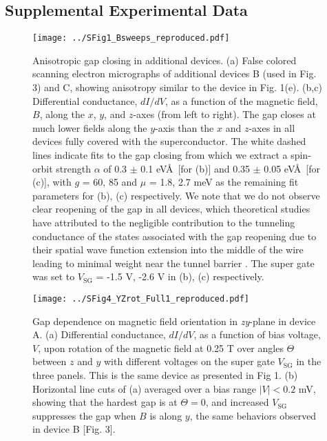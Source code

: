 \subsection{Supplemental Experimental Data}
\begin{figure}[h!]
\centering
\texttt{[image: ../SFig1\_Bsweeps\_reproduced.pdf]}
\caption{\label{fig:BsweepsReproduced}
    Anisotropic gap closing in additional devices. 
    (a) False colored scanning electron micrographs of additional devices B (used in Fig. 3) and C, showing anisotropy similar to the device in Fig. 1(e). (b,c) Differential conductance, $dI/dV$, as a function of the magnetic field, $B$, along the $x$, $y$, and $z$-axes (from left to right). The gap closes at much lower fields along the $y$-axis than the $x$ and $z$-axes in all devices fully covered with the superconductor. The white dashed lines indicate fits to the gap closing from which we extract a spin-orbit strength $\alpha$ of 0.3 $\pm$ 0.1 eV\AA\ [for (b)] and 0.35 $\pm$ 0.05 eV\AA\ [for (c)], with $g$ = 60, 85 and $\mu$ = 1.8, 2.7 meV as the remaining fit parameters for (b), (c) respectively. We note that we do not observe clear reopening of the gap in all devices, which theoretical studies have attributed to the negligible contribution to the tunneling conductance of the states associated with the gap reopening due to their spatial wave function extension into the middle of the wire leading to minimal weight near the tunnel barrier \cite{Prada2012,Pientka2012,Stanescu2012,Liu2019}. The super gate was set to $V_{\mathrm{SG}}$ = -1.5 V, -2.6 V in (b), (c) respectively.
}
\end{figure}

\begin{figure}[p!]
\centering
\texttt{[image: ../SFig4\_YZrot\_Full1\_reproduced.pdf]}
\caption{\label{fig:YZrotRep}
    Gap dependence on magnetic field orientation in \textit{zy}-plane in device A. 
    (a) Differential conductance, $dI/dV$, as a function of bias voltage, $V$, upon rotation of the magnetic field at 0.25 T over angles $\Theta$ between $z$ and $y$ with different voltages on the super gate $V_{\mathrm{SG}}$ in the three panels. This is the same device as presented in Fig 1. (b) Horizontal line cuts of (a) averaged over a bias range $|V| < 0.2$ mV, showing that the hardest gap is at $\Theta = 0$, and increased $V_{\mathrm{SG}}$ suppresses the gap when $B$ is along $y$, the same behaviors observed in device B [Fig. 3].
}
\end{figure}

